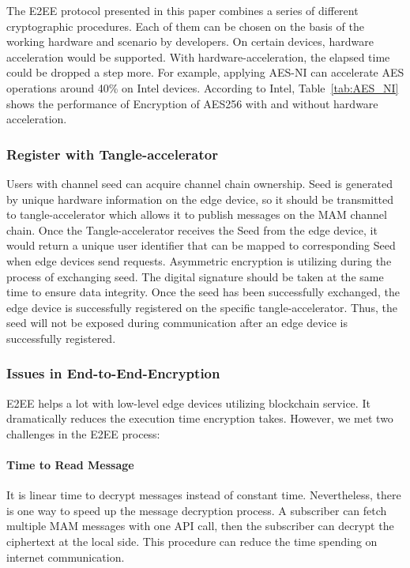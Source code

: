 \begin{spacing}{2.0}
The E2EE protocol presented in this paper combines a series of different cryptographic procedures. Each of them can be chosen on the basis of the working hardware and scenario by developers. On certain devices, hardware acceleration would be supported. With hardware-acceleration, the elapsed time could be dropped a step more. For example, applying AES-NI can accelerate AES operations around 40\% on Intel devices.\cite{AES-NI-Acceleration} According to Intel, Table~\ref{tab:AES_NI} shows the performance of Encryption of AES256 with and without hardware acceleration.

\subsubsection{Register with Tangle-accelerator}
Users with channel seed can acquire channel chain ownership. Seed is generated by unique hardware information on the edge device, so it should be transmitted to tangle-accelerator which allows it to publish messages on the MAM channel chain. Once the Tangle-accelerator receives the Seed from the edge device, it would return a unique user identifier that can be mapped to corresponding Seed when edge devices send requests. Asymmetric encryption is utilizing during the process of exchanging seed. The digital signature should be taken at the same time to ensure data integrity. Once the seed has been successfully exchanged, the edge device is successfully registered on the specific tangle-accelerator. Thus, the seed will not be exposed during communication after an edge device is successfully registered.

\subsubsection{Issues in End-to-End-Encryption}
E2EE helps a lot with low-level edge devices utilizing blockchain service. It dramatically reduces the execution time encryption takes. However, we met two challenges in the E2EE process:

\paragraph{Time to Read Message}
It is linear time to decrypt messages instead of constant time. Nevertheless, there is one way to speed up the message decryption process. A subscriber can fetch multiple MAM messages with one API call, then the subscriber can decrypt the ciphertext at the local side. This procedure can reduce the time spending on internet communication.


\end{spacing}

